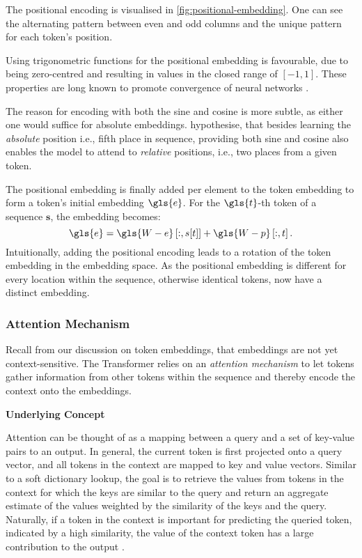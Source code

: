 The positional encoding is visualised in \cref{fig:positional-embedding}. One can see the alternating pattern between even and odd columns and the unique pattern for each \gls{token}'s position.

Using trigonometric functions for the positional embedding is favourable, due to being zero-centred and resulting in values in the closed range of $[-1,1]$. These properties are long known to promote convergence of neural networks \autocites[][8-9]{lecunEfficientBackProp2012}[][2]{ioffeBatchNormalizationAccelerating2015}.

The reason for encoding with both the sine and cosine is more subtle, as either one would suffice for absolute embeddings. \textcite[][6]{vaswaniAttentionAllYou2017} hypothesise, that besides learning the \emph{absolute} position i.e., fifth place in sequence, providing both sine and cosine also enables the model to attend to \emph{relative} positions, i.e., two places from a given \gls{token}.

The positional embedding is finally added per element to the token embedding to form a \gls{token}'s initial embedding $\gls{e}$. For the $\gls{t}$-th \gls{token} of a sequence $\mathbf{s}$, the embedding becomes:
\begin{equation}
    \gls{e}=\gls{W-e}\left[:, s[t]\right]+\gls{W-p}\left[:, t\right].
    \label{eq:positional-embedding}
\end{equation}
Intuitionally, adding the positional encoding leads to a rotation of the \gls{token} embedding in the embedding space. As the positional embedding is different for every location within the sequence, otherwise identical \glspl{token}, now have a distinct embedding.

\subsubsection{Attention Mechanism}\label{sec:attention}

Recall from our discussion on token embeddings, that embeddings are not yet context-sensitive. The Transformer relies on an \emph{attention mechanism} to let tokens gather information from other tokens within the sequence and thereby encode the context onto the embeddings.

\textbf{Underlying Concept}

Attention can be thought of as a mapping between a query and a set of key-value pairs to an output. In general, the current token is first projected onto a query vector, and all tokens in the context are mapped to key and value vectors. Similar to a soft dictionary lookup, the goal is to retrieve the values from tokens in the context for which the keys are similar to the query and return an aggregate estimate of the values weighted by the similarity of the keys and the query. Naturally, if a token in the context is important for predicting the queried token, indicated by a high similarity, the value of the context token has a large contribution to the output \autocites[][5]{phuongFormalAlgorithmsTransformers2022}[][3]{vaswaniAttentionAllYou2017}.

